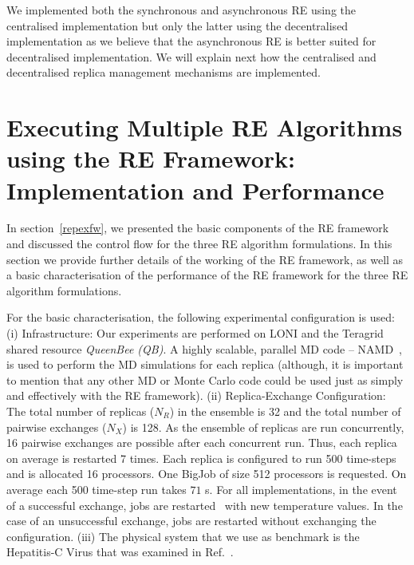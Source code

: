 \documentclass{rspublic}
\newcommand{\jhanote}[1]{ {\textcolor{red} { ***shantenu: #1 }}}
\newcommand{\alnote}[1]{ {\textcolor{blue} { ***andre: #1 }}}
\newcommand{\athotanote}[1]{ {\textcolor{green} { ***athota: #1 }}}
\newcommand{\alnote}[1]{}
\newcommand{\athotanote}[1]{}
\newcommand{\jhanote}[1]{}
\begin{document}

We implemented both the synchronous and asynchronous RE using the
centralised implementation but only the latter using the decentralised
implementation as we believe that the asynchronous RE is better suited
for decentralised implementation. We will explain next how the
centralised and decentralised replica management mechanisms are
implemented.



\section{Executing Multiple RE Algorithms using the RE Framework: Implementation and Performance}
\label{sec:re_impl}

In section~\ref{repexfw}, we presented the basic components of the RE
framework and discussed the control flow for the three RE algorithm
formulations.  In this section we provide further details of the
working of the RE framework, as well as a basic characterisation of
the performance of the RE framework for the three RE algorithm
formulations.


For the basic characterisation, the following experimental
configuration is used: (i) Infrastructure: Our experiments are
performed on LONI and the Teragrid shared resource \emph{QueenBee (QB)}. A
highly scalable, parallel MD code -- NAMD~\citep{Phillips:2005gd}, is
used to perform the MD simulations for each replica (although, it
is important to mention that any other MD or Monte Carlo code could be
used just as simply and effectively with the RE framework).  (ii)
Replica-Exchange Configuration: The total number of replicas ($N_R$)
in the ensemble is 32 and the total number of pairwise exchanges
($N_X$) is 128. As the ensemble of replicas are run concurrently, 16
pairwise exchanges are possible after each concurrent run. Thus, each
replica on average is restarted 7 times.  Each replica is configured
to run 500 time-steps and is allocated 16 processors. One BigJob of
size 512 processors is requested. On average each 500 time-step run
takes $71$ s.  For all implementations, in the event of a
successful exchange, jobs are restarted~\citep{Luckow:2008fp} with new
temperature values.  In the case of an unsuccessful exchange, jobs are
restarted without exchanging the configuration.  (iii) The physical
system that we use as benchmark is the Hepatitis-C Virus that was
examined in Ref.~\cite{Luckow:2008fp}.
\end{document}
